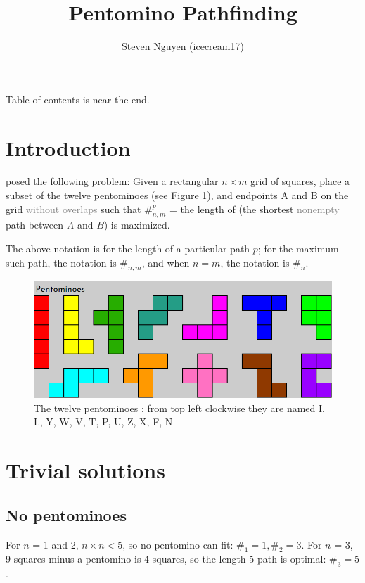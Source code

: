 \documentclass{article}
\title{Pentomino Pathfinding}
\author{Steven Nguyen (icecream17)}
\begin{document}
\maketitle

Table of contents is near the end.

\section{Introduction}

\cite{v1} posed the following problem: Given a rectangular $n \times m$ grid of squares,
place a subset of the twelve pentominoes (see Figure \ref{fig:pentominoes}), and endpoints A and B on the grid \textcolor{gray}{without overlaps} such that $\#^{p}_{n, m}$ = the length of (the shortest \textcolor{gray}{nonempty} path between $A$ and $B$) is maximized.

The above notation is for the length of a particular path $p$; for the maximum such path, the notation is $\#_{n, m}$, and when $n = m$, the notation is $\#_n$.

\begin{figure}[!h]
    \centering
    \includegraphics[width=0.5\linewidth]{pentominoes.png}
    \caption{The twelve pentominoes \cite{sheet};
    from top left clockwise they are named I, L, Y, W, V, T, P, U, Z, X, F, N}
    \label{fig:pentominoes}
\end{figure}

\section{Trivial solutions}

\subsection{No pentominoes}

For $n$ = 1 and 2, $n \times n < 5$, so no pentomino can fit: $\#_1 = 1, \#_2 = 3$.
For $n$ = 3, 9 squares minus a pentomino is 4 squares, so the length 5 path is optimal: $\#_3 = 5$.
\end{document}

